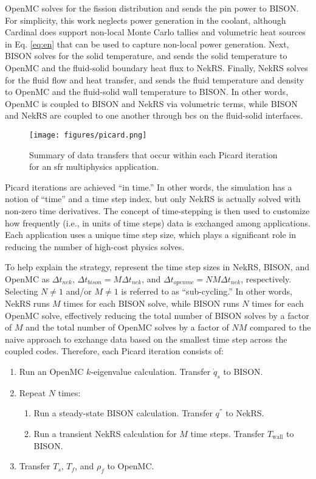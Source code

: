 \documentclass[3p,,preprint,11pt]{elsarticle}
\begin{document}
OpenMC solves for the fission distribution and sends the pin power to BISON. For simplicity, this work neglects power generation in the coolant, although Cardinal does support non-local Monte Carlo tallies and volumetric heat sources in Eq. \eqref{eq:en} that can be used to capture non-local power generation. Next, BISON solves for the solid temperature, and sends the solid temperature to OpenMC and the fluid-solid boundary heat flux to NekRS. Finally, NekRS solves for the fluid flow and heat transfer, and sends the fluid temperature and density to OpenMC and the fluid-solid wall temperature to BISON. In other words, OpenMC is coupled to BISON and NekRS via volumetric terms, while BISON and NekRS are coupled to one another through \glspl{bc} on the fluid-solid interfaces.

\begin{figure}[!htb]                                                                                                  
\centering
\texttt{[image: figures/picard.png]}
\caption{Summary of data transfers that occur within each Picard iteration for an \gls{sfr} multiphysics application.}
\label{fig:picard}
\end{figure}

Picard iterations are achieved ``in time.'' In other words, the simulation has a notion of ``time'' and a time step index, but only NekRS is actually solved with non-zero time derivatives. The concept of time-stepping is then used to
customize how frequently (i.e., in units of time steps) data is exchanged among applications.
Each application uses a unique time step size, which plays a significant role in reducing the number of high-cost physics solves.

To help explain the strategy, represent the time step sizes in NekRS, BISON, and OpenMC as
$\Delta t_{nek}$, $\Delta t_{bison}=M\Delta t_{nek}$, and $\Delta t_{openmc}=NM\Delta t_{nek}$, respectively.
Selecting $N\neq1$ and/or $M\neq1$ is referred to as ``sub-cycling.'' In other words,
NekRS runs $M$ times for each BISON solve, while BISON runs $N$ times for each OpenMC solve, effectively reducing the total number of BISON solves by a factor of $M$ and the total number of OpenMC solves by a factor of $NM$ compared to the naive approach to exchange data based on the smallest time step across the coupled codes. 
Therefore, each Picard iteration consists of:

\begin{enumerate}
\item Run an OpenMC $k$-eigenvalue calculation. Transfer $\dot{q}_s$ to BISON.
\item Repeat $N$ times:
  \begin{enumerate}
  \item Run a steady-state BISON calculation. Transfer $q^{''}$ to NekRS.
  \item Run a transient NekRS calculation for $M$ time steps. Transfer $T_\text{wall}$ to BISON.
  \end{enumerate}
\item Transfer $T_s$, $T_f$, and $\rho_f$ to OpenMC.
\end{enumerate}
\end{document}
